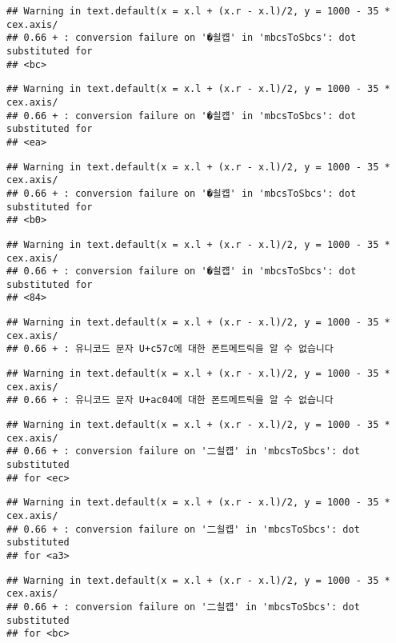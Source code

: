 \documentclass[]{article}
\begin{document}
\begin{verbatim}
## Warning in text.default(x = x.l + (x.r - x.l)/2, y = 1000 - 35 * cex.axis/
## 0.66 + : conversion failure on '�쇨컙' in 'mbcsToSbcs': dot substituted for
## <bc>
\end{verbatim}

\begin{verbatim}
## Warning in text.default(x = x.l + (x.r - x.l)/2, y = 1000 - 35 * cex.axis/
## 0.66 + : conversion failure on '�쇨컙' in 'mbcsToSbcs': dot substituted for
## <ea>
\end{verbatim}

\begin{verbatim}
## Warning in text.default(x = x.l + (x.r - x.l)/2, y = 1000 - 35 * cex.axis/
## 0.66 + : conversion failure on '�쇨컙' in 'mbcsToSbcs': dot substituted for
## <b0>
\end{verbatim}

\begin{verbatim}
## Warning in text.default(x = x.l + (x.r - x.l)/2, y = 1000 - 35 * cex.axis/
## 0.66 + : conversion failure on '�쇨컙' in 'mbcsToSbcs': dot substituted for
## <84>
\end{verbatim}

\begin{verbatim}
## Warning in text.default(x = x.l + (x.r - x.l)/2, y = 1000 - 35 * cex.axis/
## 0.66 + : 유니코드 문자 U+c57c에 대한 폰트메트릭을 알 수 없습니다
\end{verbatim}

\begin{verbatim}
## Warning in text.default(x = x.l + (x.r - x.l)/2, y = 1000 - 35 * cex.axis/
## 0.66 + : 유니코드 문자 U+ac04에 대한 폰트메트릭을 알 수 없습니다
\end{verbatim}

\begin{verbatim}
## Warning in text.default(x = x.l + (x.r - x.l)/2, y = 1000 - 35 * cex.axis/
## 0.66 + : conversion failure on '二쇨컙' in 'mbcsToSbcs': dot substituted
## for <ec>
\end{verbatim}

\begin{verbatim}
## Warning in text.default(x = x.l + (x.r - x.l)/2, y = 1000 - 35 * cex.axis/
## 0.66 + : conversion failure on '二쇨컙' in 'mbcsToSbcs': dot substituted
## for <a3>
\end{verbatim}

\begin{verbatim}
## Warning in text.default(x = x.l + (x.r - x.l)/2, y = 1000 - 35 * cex.axis/
## 0.66 + : conversion failure on '二쇨컙' in 'mbcsToSbcs': dot substituted
## for <bc>
\end{verbatim}
\end{document}
